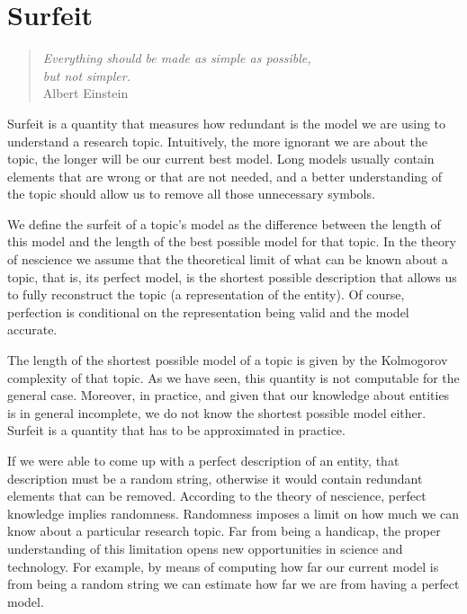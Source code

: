 %
%


\chapter{Surfeit}
\label{chap:Redundancy}

\begin{quote}
\begin{flushright}
\emph{Everything should be made as simple as possible,\\
but not simpler.}\\
Albert Einstein 
\end{flushright}
\end{quote}
\bigskip

Surfeit is a quantity that measures how redundant is the model we are using to understand a research topic. Intuitively, the more ignorant we are about the topic, the longer will be our current best model. Long models usually contain elements that are wrong or that are not needed, and a better understanding of the topic should allow us to remove all those unnecessary symbols. 

We define the surfeit of a topic's model as the difference between the length of this model and the length of the best possible model for that topic. In the theory of nescience we assume that the theoretical limit of what can be known about a topic, that is, its perfect model, is the shortest possible description that allows us to fully reconstruct the topic (a representation of the entity). Of course, perfection is conditional on the representation being valid and the model accurate.

The length of the shortest possible model of a topic is given by the Kolmogorov complexity of that topic. As we have seen, this quantity is not computable for the general case. Moreover, in practice, and given that our knowledge about entities is in general incomplete, we do not know the shortest possible model either. Surfeit is a quantity that has to be approximated in practice.

If we were able to come up with a perfect description of an entity, that description must be a random string, otherwise it would contain redundant elements that can be removed. According to the theory of nescience, perfect knowledge implies randomness. Randomness imposes a limit on how much we can know about a particular research topic. Far from being a handicap, the proper understanding of this limitation opens new opportunities in science and technology. For example, by means of computing how far our current model is from being a random string we can estimate how far we are from having a perfect model.


